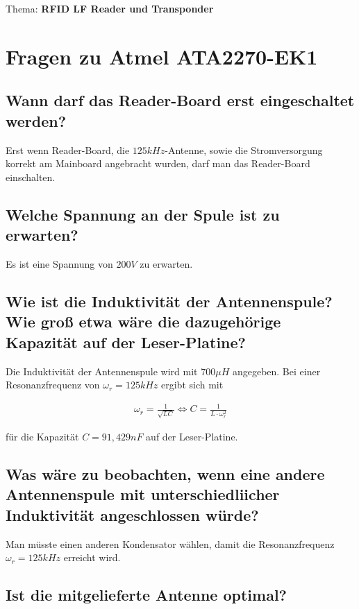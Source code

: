 \documentclass[paper=a4,fontsize=11pt,headsepline,footsepline,parskip=half]{scrartcl}
\begin{document}
\begin{titlepage}
\noindent
\large{Thema: \textbf{RFID LF Reader und Transponder}}

\section{Fragen zu Atmel ATA2270-EK1}

\subsection{Wann darf das Reader-Board erst eingeschaltet werden?}

Erst wenn Reader-Board, die $125 kHz$-Antenne, sowie die Stromversorgung korrekt am Mainboard angebracht wurden, darf man das Reader-Board einschalten.

\subsection{Welche Spannung an der Spule ist zu erwarten?}

Es ist eine Spannung von $200 V$ zu erwarten.

\subsection{Wie ist die Induktivität der Antennenspule? Wie groß etwa wäre die dazugehörige Kapazität auf der Leser-Platine?}

Die Induktivität der Antennenspule wird mit $700 \mu H$ angegeben. Bei einer Resonanzfrequenz von $\omega_r = 125 kHz$ ergibt sich mit

\end{titlepage}

\begin{align}
 \omega_r = \frac{1}{\sqrt{LC}} \Leftrightarrow C = \frac{1}{L \cdot \omega_r^2}
\end{align}

für die Kapazität $C = 91,429 nF$ auf der Leser-Platine.

\subsection{Was wäre zu beobachten, wenn eine andere Antennenspule mit unterschiedliicher Induktivität angeschlossen würde?}

Man müsste einen anderen Kondensator wählen, damit die Resonanzfrequenz $\omega_r = 125 kHz$ erreicht wird.

\subsection{Ist die mitgelieferte Antenne optimal?}
\end{document}
